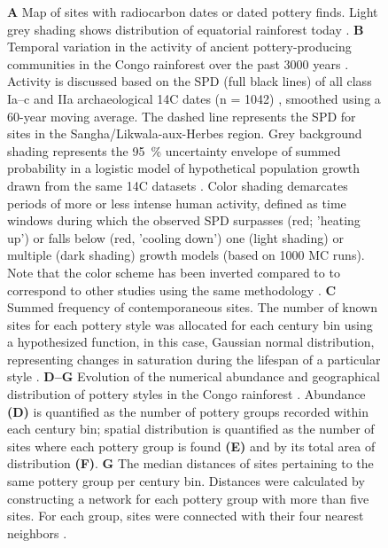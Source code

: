 \documentclass[smallextended,natbib]{svjour3}       %
\begin{document}
\begin{figure}[t!]
	\caption{\textbf{A} Map of sites with radiocarbon dates or dated pottery finds. Light grey shading shows distribution of equatorial rainforest today \citep{White.1983}. \textbf{B} Temporal variation in the activity of ancient pottery-producing communities in the Congo rainforest over the past 3000 years \citep[regions A--H in][Fig.~2]{Seidensticker.2021}. Activity is discussed based on the SPD (full black lines) of all class Ia--c and IIa archaeological 14C dates (n = 1042) \citep{Seidensticker.2021f}, smoothed using a 60-year moving average. The dashed line represents the SPD for sites in the Sangha/Likwala-aux-Herbes region. Grey background shading represents the 95~\% uncertainty envelope of summed probability in a logistic model of hypothetical population growth drawn from the same 14C datasets \citep{Bevan.2022}. Color shading demarcates periods of more or less intense human activity, defined as time windows during which the observed SPD surpasses (red; 'heating up') or falls below (red, 'cooling down') one (light shading) or multiple (dark shading) growth models (based on 1000 MC runs). Note that the color scheme has been inverted compared to \citep[Fig.~2]{Seidensticker.2021} to correspond to other studies using the same methodology \citep{Crema.2016,Bevan.2017,Riris.2018,Riris.2019a,Brown.2019,Arroyo-Kalin.2021,deSouza.2021}. \textbf{C} Summed frequency of contemporaneous sites. The number of known sites for each pottery style was allocated for each century bin using a hypothesized function, in this case, Gaussian normal distribution, representing changes in saturation during the lifespan of a particular style \citep{Roberts.2012}. \textbf{D--G} Evolution of the numerical abundance and geographical distribution of pottery styles in the Congo rainforest \citep[Fig.~3]{Seidensticker.2021}. Abundance \textbf{(D)} is quantified as the number of pottery groups recorded within each century bin; spatial distribution is quantified as the number of sites where each pottery group is found \textbf{(E)} and by its total area of distribution \textbf{(F)}. \textbf{G} The median distances of sites pertaining to the same pottery group per century bin. Distances were calculated by constructing a network for each pottery group with more than five sites. For each group, sites were connected with their four nearest neighbors \citep{bivand2011spdep}.}
\end{figure}
\end{document}
